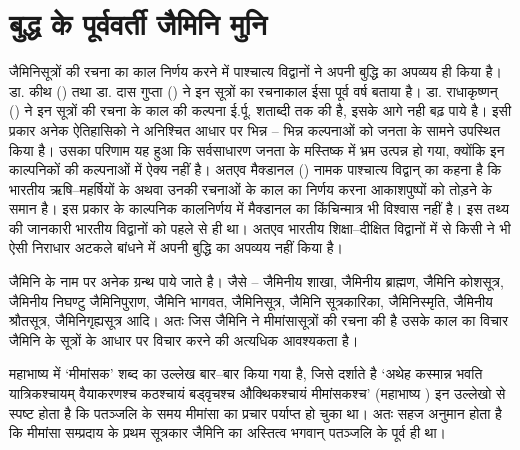 \begin{myquote}
\end{myquote}


\section*{बुद्ध के पूर्ववर्ती जैमिनि मुनि}

जैमिनिसूत्रों की रचना का काल निर्णय करने में पाश्चात्य विद्वानों ने अपनी बुद्धि का अपव्यय ही किया है। डा. कीथ () तथा डा. दास गुप्ता () ने इन सूत्रों का रचनाकाल ईसा पूर्व  वर्ष बताया है। डा. राधाकृष्णन् () ने इन सूत्रों की रचना के काल की कल्पना ई.र्पू. शताब्दी तक की है, इसके आगे नही बढ़ पाये है। इसी प्रकार अनेक ऐतिहासिको ने अनिश्चित आधार पर भिन्न – भिन्न कल्पनाओं को जनता के सामने उपस्थित किया है। उसका परिणाम यह हुआ कि सर्वसाधारण जनता के मस्तिष्क में भ्रम उत्पन्न हो गया, क्योंकि इन काल्पनिकों की कल्पनाओं में ऐक्य नहीं है। अतएव मैक्डानल () नामक पाश्चात्य विद्वान् का कहना है कि भारतीय ऋषि–महर्षियों के अथवा उनकी रचनाओं के काल का निर्णय करना आकाशपुष्पों को तोड़ने के समान है। इस प्रकार के काल्पनिक कालनिर्णय में मैक्डानल का किंचिन्मात्र भी विश्वास नहीं है। इस तथ्य की जानकारी भारतीय विद्वानों को पहले से ही था। अतएव भारतीय शिक्षा–दीक्षित विद्वानों में से किसी ने भी ऐसी निराधार अटकले बांधने में अपनी बुद्धि का अपव्यय नहीं किया है। 

जैमिनि के नाम पर अनेक ग्रन्थ पाये जाते है। जैसे – जैमिनीय शाखा, जैमिनीय ब्राह्मण, जैमिनि कोशसूत्र, जैमिनीय निघण्टु जैमिनिपुराण, जैमिनि भागवत, जैमिनिसूत्र, जैमिनि सूत्रकारिका, जैमिनिस्मृति, जैमिनीय श्रौतसूत्र, जैमिनिगृह्यसूत्र आदि। अतः जिस जैमिनि ने मीमांसासूत्रों की रचना की है उसके काल का विचार जैमिनि के सूत्रों के आधार पर विचार करने की अत्यधिक आवश्यकता है। 

महाभाष्य में ‘मीमांसक' शब्द का उल्लेख बार–बार किया गया है, जिसे दर्शाते है ‘अथेह कस्मान्न भवति यात्रिकश्चायम् वैयाकरणश्च कठश्चायं बड्वृचश्च औक्थिकश्चायं मीमांसकश्च' (महाभाष्य ) इन उल्लेखो से स्पष्ट होता है कि पतञ्जलि के समय मीमांसा का प्रचार पर्याप्त हो चुका था। अतः सहज अनुमान होता है कि मीमांसा सम्प्रदाय के प्रथम सूत्रकार जैमिनि का अस्तित्व भगवान् पतञ्जलि के पूर्व ही था।

